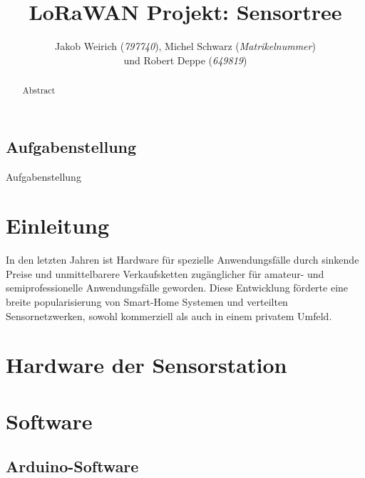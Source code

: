 \documentclass{article}
\title{LoRaWAN Projekt: Sensortree}
\author{Jakob Weirich (\textit{797740}), Michel Schwarz (\textit{Matrikelnummer}) \\und Robert Deppe (\textit{649819})}
\begin{document}
\setlength{\parindent}{0cm} %
\onehalfspacing
\maketitle
\newpage

\tableofcontents
\newpage

\subsection*{Aufgabenstellung}
Aufgabenstellung

\vfill{}

\begin{abstract}
    Abstract
\end{abstract}

\vfill{}

\newpage

\setcounter{page}{1}

\section{Einleitung}
In den letzten Jahren ist Hardware für spezielle Anwendungsfälle durch sinkende Preise und unmittelbarere Verkaufsketten zugänglicher für amateur- und semiprofessionelle Anwendungsfälle geworden. %
Diese Entwicklung förderte eine breite popularisierung von Smart-Home Systemen und verteilten Sensornetzwerken, sowohl kommerziell als auch in einem privatem Umfeld. %

\newpage

\section{Hardware der Sensorstation}

\section{Software}


\subsection{Arduino-Software}
\end{document}
